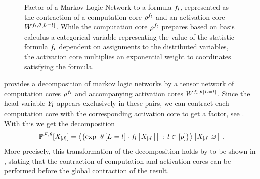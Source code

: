 \begin{figure}[t!]
\begin{center}
	
\end{center}
\caption{Factor of a Markov Logic Network to a formula $f_{l}$, represented as the contraction of a computation core $\rho^{f_{l}}$ and an activation core $W^{f_{l},\theta\left[L_{}=l_{}\right]}$.
	While the computation core $\rho^{f_{l}}$ prepares based on basis calculus a categorical variable representing the value of the statistic formula $f_{l}$ dependent on assignments to the distributed variables, the activation core multiplies an exponential weight to coordinates satisfying the formula.
}
\label{fig:mlnFactor}
\end{figure}

 provides a decomposition of markov logic networks by a tensor network of computation cores $\rho^{f_{l}}$ and accompanying activation cores $W^{f_{l},\theta\left[L_{}=l_{}\right]}$.
Since the head variable $Y_{l}$ appears exclusively in these pairs, we can contract each computation core with the corresponding activation core to get a factor, see .
With this we get the decomposition
\begin{align*}
	\mathbb{P}^{\mathcal{F},\theta}[X_{[d]}]
	= \left\langle \{\mathrm{exp}\left[\theta\left[L_{}=l_{}\right]\cdot f_{l}\left[X_{[d]}\right]\right] \, : \, l\in[p]\}\right\rangle \left[ X_{[d]} | \varnothing \right] \, .
\end{align*}
More precisely, this transformation of the decomposition holds by  to be shown in , stating that the contraction of computation and activation cores can be performed before the global contraction of the result. 

